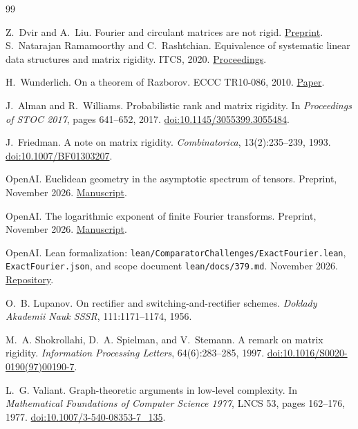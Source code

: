 \documentclass[11pt]{article}
\theoremstyle{definition}
\theoremstyle{remark}
\begin{document}
\begin{thebibliography}{99}
\small\raggedright
\setlength{\itemsep}{2pt}
 Z.~Dvir and A.~Liu. Fourier and circulant matrices are
not rigid. \href{https://arxiv.org/abs/1902.07334}{Preprint}.
S.~Natarajan Ramamoorthy and C.~Rashtchian. Equivalence of systematic
linear data structures and matrix rigidity. ITCS, 2020.
\href{https://doi.org/10.4230/LIPIcs.ITCS.2020.35}{Proceedings}.

H.~Wunderlich. On a theorem of Razborov. ECCC TR10-086, 2010.
\href{https://eccc.weizmann.ac.il/report/2010/086/}{Paper}.

J.~Alman and R.~Williams. Probabilistic rank and matrix rigidity.
In \emph{Proceedings of STOC 2017}, pages 641--652, 2017.
\href{https://doi.org/10.1145/3055399.3055484}{doi:10.1145/3055399.3055484}.

J.~Friedman. A note on matrix rigidity. \emph{Combinatorica},
13(2):235--239, 1993.
\href{https://doi.org/10.1007/BF01303207}{doi:10.1007/BF01303207}.

OpenAI. Euclidean geometry in the asymptotic spectrum of tensors.
Preprint, November 2026.
\href{https://github.com/openai/math/blob/3344da59991ed94f9ba711217b29c1d760badfa6/preprints/Euclidean-geometry-in-the-asymptotic-spectrum-of-tensors-November-24-2026/paper.pdf}{Manuscript}.

OpenAI. The logarithmic exponent of finite Fourier transforms.
Preprint, November 2026.
\href{https://github.com/openai/math/blob/3344da59991ed94f9ba711217b29c1d760badfa6/preprints/The-logarithmic-exponent-of-finite-Fourier-transforms-November-24-2026/paper.pdf}{Manuscript}.

OpenAI. Lean formalization: \texttt{lean/ComparatorChallenges/ExactFourier.lean},
\texttt{ExactFourier.json}, and scope document \texttt{lean/docs/379.md}.
November 2026.
\href{https://github.com/openai/math/tree/3344da59991ed94f9ba711217b29c1d760badfa6/lean}{Repository}.

O.~B. Lupanov. On rectifier and switching-and-rectifier schemes.
\emph{Doklady Akademii Nauk SSSR}, 111:1171--1174, 1956.

M.~A. Shokrollahi, D.~A. Spielman, and V.~Stemann. A remark on matrix
rigidity. \emph{Information Processing Letters}, 64(6):283--285, 1997.
\href{https://doi.org/10.1016/S0020-0190(97)00190-7}{doi:10.1016/S0020-0190(97)00190-7}.

L.~G. Valiant. Graph-theoretic arguments in low-level complexity.
In \emph{Mathematical Foundations of Computer Science 1977}, LNCS 53,
pages 162--176, 1977.
\href{https://doi.org/10.1007/3-540-08353-7_135}{doi:10.1007/3-540-08353-7\_135}.
\end{thebibliography}
\end{document}
